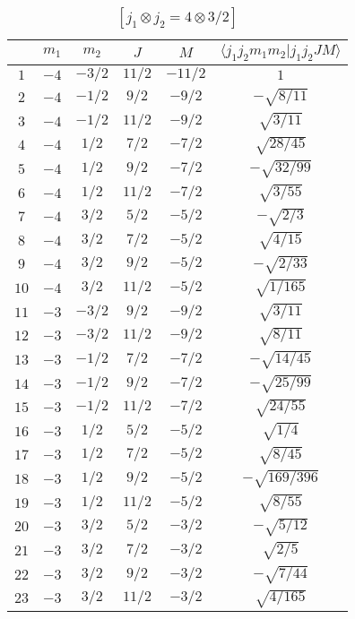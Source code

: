 \begin{table}
\tiny
\caption{$[j_1 \otimes j_2 = 4 \otimes 3/2]$}
\begin{center}
\begin{tabular}{|c|c|c|c|c|c|}
\hline 
   & $m_1$ & $m_2$ & $J$ & $M$ & $\langle j_1 j_2 m_1 m_2 | j_1 j_2 J M \rangle$ \\ 
\hline 
$1$ & $-4$ & $-3/2$ & $11/2$ & $-11/2$ & $1$ \\ 
$2$ & $-4$ & $-1/2$ & $9/2$ & $-9/2$ & $-\sqrt{8/11}$ \\ 
$3$ & $-4$ & $-1/2$ & $11/2$ & $-9/2$ & $\sqrt{3/11}$ \\ 
$4$ & $-4$ & $1/2$ & $7/2$ & $-7/2$ & $\sqrt{28/45}$ \\ 
$5$ & $-4$ & $1/2$ & $9/2$ & $-7/2$ & $-\sqrt{32/99}$ \\ 
$6$ & $-4$ & $1/2$ & $11/2$ & $-7/2$ & $\sqrt{3/55}$ \\ 
$7$ & $-4$ & $3/2$ & $5/2$ & $-5/2$ & $-\sqrt{2/3}$ \\ 
$8$ & $-4$ & $3/2$ & $7/2$ & $-5/2$ & $\sqrt{4/15}$ \\ 
$9$ & $-4$ & $3/2$ & $9/2$ & $-5/2$ & $-\sqrt{2/33}$ \\ 
$10$ & $-4$ & $3/2$ & $11/2$ & $-5/2$ & $\sqrt{1/165}$ \\ 
$11$ & $-3$ & $-3/2$ & $9/2$ & $-9/2$ & $\sqrt{3/11}$ \\ 
$12$ & $-3$ & $-3/2$ & $11/2$ & $-9/2$ & $\sqrt{8/11}$ \\ 
$13$ & $-3$ & $-1/2$ & $7/2$ & $-7/2$ & $-\sqrt{14/45}$ \\ 
$14$ & $-3$ & $-1/2$ & $9/2$ & $-7/2$ & $-\sqrt{25/99}$ \\ 
$15$ & $-3$ & $-1/2$ & $11/2$ & $-7/2$ & $\sqrt{24/55}$ \\ 
$16$ & $-3$ & $1/2$ & $5/2$ & $-5/2$ & $\sqrt{1/4}$ \\ 
$17$ & $-3$ & $1/2$ & $7/2$ & $-5/2$ & $\sqrt{8/45}$ \\ 
$18$ & $-3$ & $1/2$ & $9/2$ & $-5/2$ & $-\sqrt{169/396}$ \\ 
$19$ & $-3$ & $1/2$ & $11/2$ & $-5/2$ & $\sqrt{8/55}$ \\ 
$20$ & $-3$ & $3/2$ & $5/2$ & $-3/2$ & $-\sqrt{5/12}$ \\ 
$21$ & $-3$ & $3/2$ & $7/2$ & $-3/2$ & $\sqrt{2/5}$ \\ 
$22$ & $-3$ & $3/2$ & $9/2$ & $-3/2$ & $-\sqrt{7/44}$ \\ 
$23$ & $-3$ & $3/2$ & $11/2$ & $-3/2$ & $\sqrt{4/165}$ \\ 

\end{tabular}
\end{center}
\end{table}
